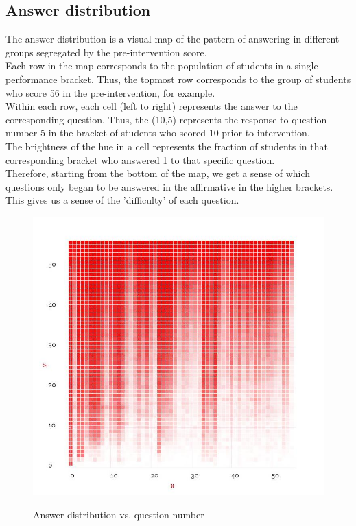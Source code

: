 \documentclass[10pt]{article}
\begin{document}
\subsection{Answer distribution}
The answer distribution is a visual map of the pattern of answering in different groups segregated by the pre-intervention score.\\
Each row in the map corresponds to the population of students in a single performance bracket. Thus, the topmost row corresponds to the group of students who score 56 in the pre-intervention, for example.\\
Within each row, each cell (left to right) represents the answer to the corresponding question. Thus, the (10,5) represents the response to question number 5 in the bracket of students who scored 10 prior to intervention.\\
The brightness of the hue in a cell represents the fraction of students in that corresponding bracket who answered 1 to that specific question.\\
Therefore, starting from the bottom of the map, we get a sense of which questions only began to be answered in the affirmative in the higher brackets. This gives us a sense of the 'difficulty' of each question.
\begin{figure}
\caption{Answer distribution vs. question number}
\label{AnswerDistribution}
\begin{center}
\includegraphics[width=120mm]{ReportMedia/AnswerDistribution.jpg}\\
\end{center}
\end{figure}
\end{document}
